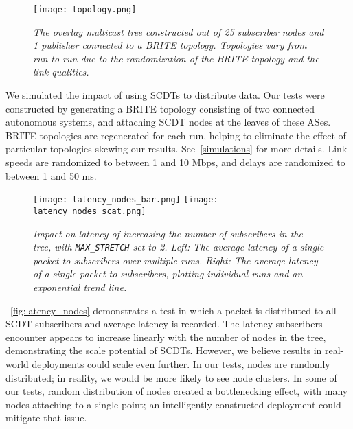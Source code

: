\begin{figure}[h]
	\begin{center}
		\texttt{[image: topology.png]}
	\end{center}
	\vspace{-1.3em}
	\caption{\small \itshape The overlay multicast tree constructed out of 25 subscriber nodes and 1 publisher connected to a BRITE topology. Topologies vary from run to run due to the randomization of the BRITE topology and the link qualities.}
	\vspace{-1em}
	\label{fig:topology}
\end{figure}

We simulated the impact of using SCDTs to distribute data. Our tests were constructed by generating a BRITE \cite{brite} topology consisting of two connected autonomous systems, and attaching SCDT nodes at the leaves of these ASes.  BRITE topologies are regenerated for each run, helping to eliminate the effect of particular topologies skewing our results.  See~\autoref{simulations} for more details. Link speeds are randomized to between 1 and 10 Mbps, and delays are randomized to between 1 and 50 ms.

\begin{figure}[h]
	\begin{center}
		\texttt{[image: latency\_nodes\_bar.png]}
		\texttt{[image: latency\_nodes\_scat.png]}
	\end{center}
	\vspace{-1.3em}
	\caption{\small \itshape Impact on latency of increasing the number of subscribers in the tree, with \texttt{MAX\_STRETCH} set to 2. Left: The average latency of a single packet to subscribers over multiple runs. Right: The average latency of a single packet to subscribers, plotting individual runs and an exponential trend line.}
	\vspace{-1em}
	\label{fig:latency_nodes}
\end{figure}

~\autoref{fig:latency_nodes} demonstrates a test in which a packet is distributed to all SCDT subscribers and average latency is recorded. The latency subscribers encounter appears to increase linearly with the number of nodes in the tree, demonstrating the scale potential of SCDTs. However, we believe results in real-world deployments could scale even further. In our tests, nodes are randomly distributed; in reality, we would be more likely to see node clusters. In some of our tests, random distribution of nodes created a bottlenecking effect, with many nodes attaching to a single point; an intelligently constructed deployment could mitigate that issue.

